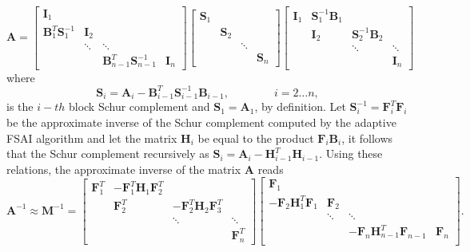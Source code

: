 \documentclass{report}
\begin{document}
\footnotesize
\begin{equation}
\mathbf{A} =
\begin{bmatrix}
\mathbf{I}_1 & & & \\
\mathbf{B}^T_1 \mathbf{S}^{-1}_1 & \mathbf{I}_2 & & \\
& \ddots & \ddots & \\
& & \mathbf{B}^T_{n-1} \mathbf{S}^{-1}_{n-1} & \mathbf{I}_{n}
\end{bmatrix}
\begin{bmatrix}
\mathbf{S}_1 & & & \\
& \mathbf{S}_2 & & \\
& & \ddots & \\
& & & \mathbf{S}_n
\end{bmatrix}
\begin{bmatrix}
\mathbf{I}_1 & \mathbf{S}^{-1}_1 \mathbf{B}_1 & & \\
& \mathbf{I}_2 & \mathbf{S}^{-1}_2 \mathbf{B}_2 & \\
& & \ddots & \ddots \\
& & & \mathbf{I}_n
\end{bmatrix}
\end{equation}
\normalsize
where
\begin{equation}
\mathbf{S}_i = \mathbf{A}_i - \mathbf{B}^T_{i-1} \mathbf{S}^{-1}_{i-1}
\mathbf{B}_{i-1}, \qquad \qquad i = 2
\dots n,
\end{equation}
is the $i-th$ block Schur complement and $\mathbf{S}_1 = \mathbf{A}_1$,
by definition. Let
$\mathbf{S}^{-1}_i = \mathbf{F}^T_i \mathbf{F}_i$ be the approximate
inverse of the Schur complement
computed by the adaptive FSAI algorithm and let the matrix $\mathbf{H}_i$ be equal to the
product $\mathbf{F}_i \mathbf{B}_i$, it follows that the Schur complement recursively as
$\mathbf{S}_i = \mathbf{A}_i - \mathbf{H}^T_{i-1} \mathbf{H}_{i-1}$.
Using these relations,
the approximate inverse of the matrix $\mathbf{A}$ reads
\footnotesize
\begin{equation}
\mathbf{A}^{-1} \approx \mathbf{M}^{-1} =
\begin{bmatrix}
\mathbf{F}^T_1 & - \mathbf{F}^T_1 \mathbf{H}_1 \mathbf{F}^T_2 & & \\
& \mathbf{F}^T_2 & - \mathbf{F}^T_2 \mathbf{H}_2 \mathbf{F}^T_3 & \\
& & \ddots & \ddots \\
& & & \mathbf{F}^T_n
\end{bmatrix}
\begin{bmatrix}
\mathbf{F}_1 & & & \\
- \mathbf{F}_2 \mathbf{H}^T_1 \mathbf{F}_1 & \mathbf{F}_2 & & \\
& \ddots & \ddots & \\
& & -\mathbf{F}_n \mathbf{H}^T_{n-1} \mathbf{F}_{n-1} & \mathbf{F}_n \\
\end{bmatrix}.
\end{equation}
\end{document}
